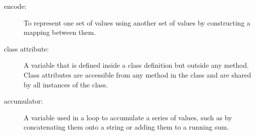 \begin{description}

\item[encode:]  To represent one set of values using another
set of values by constructing a mapping between them.

\item[class attribute:] A variable that is defined inside
a class definition but outside any method.  Class attributes
are accessible from any method in the class and are shared
by all instances of the class.

\item[accumulator:] A variable used in a loop to accumulate
a series of values, such as by concatenating them onto
a string or adding them to a running sum.


\end{description}
